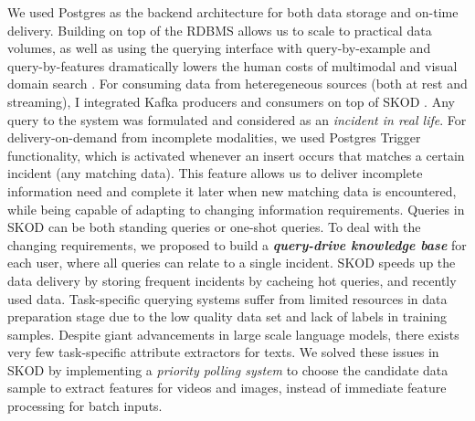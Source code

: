     We used Postgres as the backend architecture  for both data storage and on-time delivery. 
    Building on top of the RDBMS allows us to scale to practical data %
    volumes, as well as using the querying interface with query-by-example and query-by-features dramatically lowers the human costs of 
    multimodal and visual domain search \cite{stonebraker2020surveillance}.
    For consuming data from heteregeneous sources (both at rest and streaming), I integrated Kafka producers and consumers on top of SKOD \cite{palacios2019wip}. %
    Any query to the system was formulated and considered as an \textit{incident in real life}.
    For delivery-on-demand from incomplete modalities, we used Postgres Trigger functionality, which 
    is activated whenever an insert occurs that matches a certain incident (any matching data). 
    This feature allows us to deliver incomplete 
    information need %
    and complete it later when new matching data is encountered, while being capable of adapting to changing information requirements. Queries in SKOD can be both standing queries or one-shot queries. To deal with the changing requirements, we proposed to build a \textit{\textbf{query-drive knowledge base}} for each user, where all queries can relate to a single incident. SKOD speeds up the data delivery by storing frequent incidents by cacheing hot queries, and recently used data.
    Task-specific querying systems suffer from limited resources in data preparation stage due to the low quality data set and lack of labels in training samples. Despite giant advancements in large scale language models, there exists very few task-specific attribute extractors for texts. 
    We solved these issues in SKOD by implementing a \textit{priority polling system} to choose the candidate data sample to extract features for videos and images, instead of immediate feature processing for batch inputs. 

